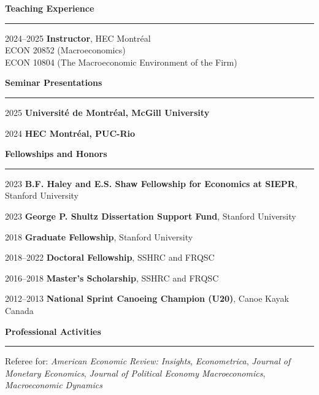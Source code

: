 \documentclass[12pt]{article}
\begin{document}
\vspace{0.5cm}

{\large \textbf{Teaching Experience}} \\
\noindent\rule[0.5\baselineskip]{\textwidth}{1pt}

\begin{small}
2024--2025 \tabto{3cm} \textbf{Instructor}, HEC Montr\'eal \\
\tabto{3cm} \hspace{0.25cm} ECON 20852 (Macroeconomics) \\
\tabto{3cm} \hspace{0.25cm} ECON 10804 (The Macroeconomic Environment of the Firm)
\end{small}

\vspace{0.5cm}

{\large \textbf{Seminar Presentations}} \\
\noindent\rule[0.5\baselineskip]{\textwidth}{1pt}

\begin{small}

2025 \tabto{3cm} \textbf{Universit\'e de Montr\'eal, McGill University}

2024 \tabto{3cm} \textbf{HEC Montr\'eal, PUC-Rio}

\end{small}

\vspace{0.5cm}

{\large \textbf{Fellowships and Honors}} \\
\noindent\rule[0.5\baselineskip]{\textwidth}{1pt}

\begin{small}

2023 \tabto{3cm} \textbf{B.F. Haley and E.S. Shaw Fellowship for Economics at SIEPR}, Stanford University

2023 \tabto{3cm} \textbf{George P. Shultz Dissertation Support Fund}, Stanford University

2018 \tabto{3cm} \textbf{Graduate Fellowship}, Stanford University

2018--2022 \tabto{3cm} \textbf{Doctoral Fellowship}, SSHRC and FRQSC

2016--2018 \tabto{3cm} \textbf{Master's Scholarship}, SSHRC and FRQSC

2012--2013 \tabto{3cm} \textbf{National Sprint Canoeing Champion (U20)}, Canoe Kayak Canada
\end{small}

\vspace{0.5cm}

{\large \textbf{Professional Activities}} \\
\noindent\rule[0.5\baselineskip]{\textwidth}{1pt}

{\small Referee for: \textit{American Economic Review: Insights}, \textit{Econometrica}, \textit{Journal of Monetary Economics}, \textit{Journal of Political Economy Macroeconomics}, \textit{Macroeconomic Dynamics}}
\end{document}
